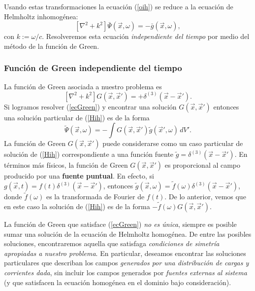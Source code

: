 Usando estas transformaciones la ecuación (\ref{oih}) se reduce a la ecuación de
Helmholtz inhomogénea:
\begin{equation}
\left[ \nabla^2+k^2\right] \bar{\Psi}(\vec{x},\omega)=-\bar{g}(\vec{x},\omega),
\label{Hih}
\end{equation}
con $k:=\omega/c$. Resolveremos esta ecuación \textit{independiente del tiempo} por medio del método de la función de Green.

\subsubsection{Función de Green independiente del tiempo}
La función de Green asociada a nuestro problema es
\begin{equation}
\left[ \nabla^2+k^2\right] G(\vec{x},\vec{x}')=+\delta^{(3)}(\vec{x}-\vec{x}').
\label{ecGreen}
\end{equation}
Si logramos resolver (\ref{ecGreen}) y encontrar una solución $G(\vec{x},\vec{x}')$ entonces una solución particular de (\ref{Hih}) es de la forma
\begin{equation}
\tilde{\Psi}(\vec{x},\omega)=-\int G(\vec{x},\vec{x}')\tilde{g}(\vec{x}',\omega)\,dV'.
\end{equation}
La función de Green $G(\vec{x},\vec{x}')$ puede considerarse como un caso particular de solución de (\ref{Hih}) correspondiente a una función fuente $\tilde{g}=\delta^{(3)}(\vec{x}-\vec{x}')$. En términos más físicos, la función de Green $G(\vec{x},\vec{x}')$ es proporcional al campo producido por una \textbf{fuente puntual}. En efecto, si $g(\vec{x},t)=f(t)\delta^{(3)}(\vec{x}-\vec{x}')$, entonces $\tilde{g}(\vec{x},\omega)=\tilde{f}(\omega)\delta^{(3)}(\vec{x}-\vec{x}')$, donde $\tilde{f}(\omega)$ es la transformada de Fourier de $f(t)$. De lo anterior, vemos que en este caso la solución de (\ref{Hih}) es de la forma $-\tilde{f}(\omega)G(\vec{x},\vec{x}')$.

La función de Green que satisface (\ref{ecGreen}) \textit{no es única}, siempre es posible sumar una solución de la ecuación de Helmholtz homogénea. De entre las posibles soluciones, encontraremos aquella que satisfaga \textit{condiciones de simetría apropiadas a nuestro problema}. En particular, deseamos encontrar las soluciones particulares que describan los campos \textit{generados por una distribución de cargas y corrientes dada}, sin incluir los campos generados por \textit{fuentes externas al sistema} (y que satisfacen la ecuación homogénea en el dominio bajo consideración).

